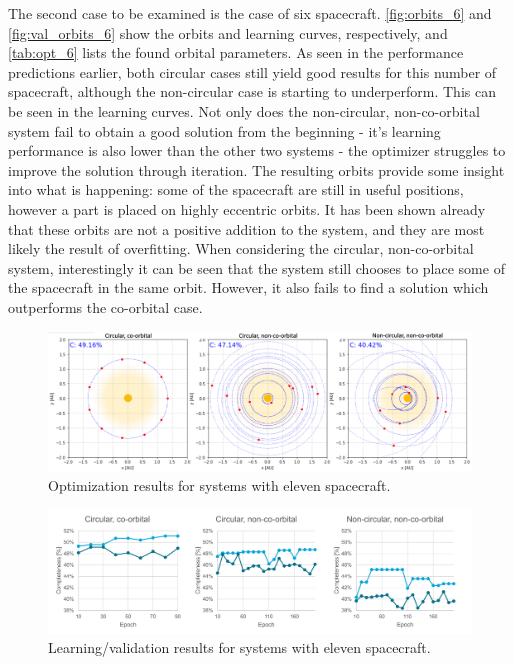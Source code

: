 The second case to be examined is the case of six spacecraft. \autoref{fig:orbits_6} and \autoref{fig:val_orbits_6} show the orbits and learning curves, respectively, and \autoref{tab:opt_6} lists the found orbital parameters. As seen in the performance predictions earlier, both circular cases still yield good results for this number of spacecraft, although the non-circular case is starting to underperform. This can be seen in the learning curves. Not only does the non-circular, non-co-orbital system fail to obtain a good solution from the beginning - it's learning performance is also lower than the other two systems - the optimizer struggles to improve the solution through iteration. The resulting orbits provide some insight into what is happening: some of the spacecraft are still in useful positions, however a part is placed on highly eccentric orbits. It has been shown already that these orbits are not a positive addition to the system, and they are most likely the result of overfitting. When considering the circular, non-co-orbital system, interestingly it can be seen that the system still chooses to place some of the spacecraft in the same orbit. However, it also fails to find a solution which outperforms the co-orbital case. \\

\begin{figure}[htbp]
 \centering
 \includegraphics[width=1.0\textwidth]{img/orbits_11.png}
 \caption{Optimization results for systems with eleven spacecraft.}
 \label{fig:orbits_11}
\end{figure}
\begin{figure}[htbp]
 \centering
 \includegraphics[width=1.0\textwidth]{img/val_orbits_11.pdf}
 \caption{Learning/validation results for systems with eleven spacecraft.}
 \label{fig:val_orbits_11}
\end{figure}

